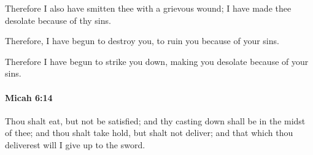 			\begin{versebox}
					\item[BHS] 
					\item[LXX] 
					\item[ASV] Therefore I also have smitten thee with a grievous wound; I have made thee desolate because of thy sins.
					\item[NIV] Therefore, I have begun to destroy you, to ruin you because of your sins.
					\item[NRSV] Therefore I have begun to strike you down, making you desolate because of your sins.
			\end{versebox}

		\paragraph{Micah 6:14} %
			\label{MICAH-6-14}

			Thou shalt eat, but not be satisfied; and thy casting down shall be in the midst of thee; and thou shalt take hold, but shalt not deliver; and that which thou deliverest will I give up to the sword.

